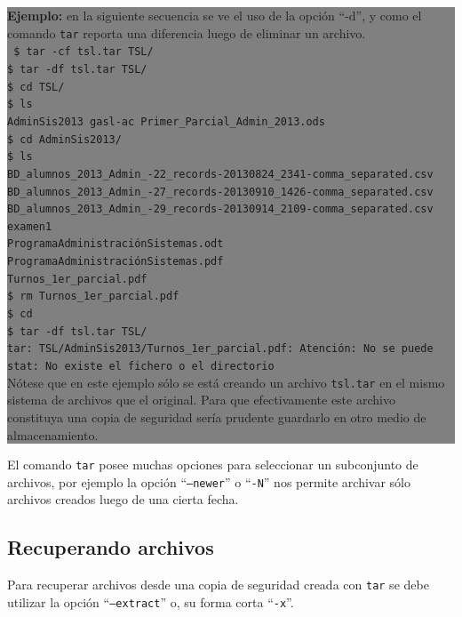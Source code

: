 \documentclass[12pt]{article}
\begin{document}
\colorbox{grey}{\parbox[t]{0.95\linewidth}{ \vspace*{0.5cm} { 
{\bf Ejemplo:} en la siguiente secuencia se ve el uso de la opción ``-d'',
y como el comando \texttt{tar} reporta una diferencia luego de eliminar 
un archivo.\\ 
{\tt
\$ tar -cf tsl.tar TSL/\\
\$ tar -df tsl.tar TSL/\\
\$ cd TSL/\\
\$ ls\\
AdminSis2013  gasl-ac  Primer\_Parcial\_Admin\_2013.ods\\
\$ cd AdminSis2013/\\
\$ ls\\
BD\_alumnos\_2013\_Admin\_-22\_records-20130824\_2341-comma\_separated.csv\\
BD\_alumnos\_2013\_Admin\_-27\_records-20130910\_1426-comma\_separated.csv\\
BD\_alumnos\_2013\_Admin\_-29\_records-20130914\_2109-comma\_separated.csv\\
examen1\\
ProgramaAdministraciónSistemas.odt\\
ProgramaAdministraciónSistemas.pdf\\
Turnos\_1er\_parcial.pdf\\
\$ rm Turnos\_1er\_parcial.pdf \\
\$ cd \\
\$ tar -df tsl.tar TSL/\\
tar: TSL/AdminSis2013/Turnos\_1er\_parcial.pdf: Atención: No se puede stat:
No existe el fichero o el directorio\\
}
Nótese que en este ejemplo sólo se está creando un  archivo {\tt tsl.tar} 
en el mismo sistema de archivos que el original. Para que efectivamente 
este archivo constituya una copia de seguridad sería prudente guardarlo 
en otro medio de almacenamiento. 
} \vspace*{0.5cm} } } 

El comando {\tt tar} posee muchas opciones para seleccionar un subconjunto
de archivos, por ejemplo la opción ``{\tt --newer}'' o ``{\tt -N}'' nos 
permite archivar sólo archivos creados luego de una cierta fecha.  

\subsection*{Recuperando archivos }

Para recuperar archivos desde una copia de seguridad creada con {\tt tar} se
debe utilizar la opción ``{\tt --extract}'' o, su forma corta ``{\tt -x}''. 
\end{document}
